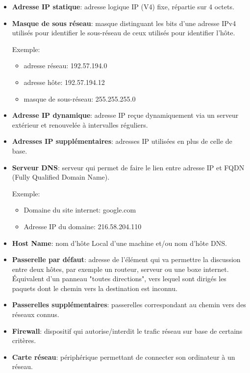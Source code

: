 \documentclass[class=article, crop=false]{standalone}
\begin{document}
\begin{itemize}
    \item \textbf{Adresse IP statique}: adresse logique IP (V4) fixe, répartie sur 4 octets.
    \item \textbf{Masque de sous réseau}: masque distinguant les bits d'une adresse IPv4 utilisés pour identifier le sous-réseau de ceux utilisés pour identifier l'hôte.
\begin{example}
Exemple:
\begin{itemize}
    \item adresse réseau: 192.57.194.0
    \item adresse hôte: 192.57.194.12
    \item masque de sous-réseau: 255.255.255.0
\end{itemize}
\end{example}
\item \textbf{Adresse IP dynamique}: adresse IP reçue dynamiquement via un serveur extérieur et renouvelée à intervalles réguliers.
\item \textbf{Adresses IP supplémentaires}: adresses IP utilisées en plus de celle de base.
\item \textbf{Serveur DNS}: serveur qui permet de faire le lien entre adresse IP et FQDN (Fully Qualified Domain Name).
\begin{example}
Exemple:
\begin{itemize}
    \item Domaine du site internet: google.com
    \item Adresse IP du domaine: 216.58.204.110
\end{itemize}
\end{example}
\item \textbf{Host Name}: nom d'hôte Local d'une machine et/ou nom d’hôte DNS.
\item \textbf{Passerelle par défaut}: adresse de l’élément qui va permettre la discussion entre deux hôtes, par exemple un routeur, serveur ou une boxe internet. Équivalent d'un panneau "toutes directions", vers lequel sont dirigés les paquets dont le chemin vers la destination est inconnu.
\item \textbf{Passerelles supplémentaires}: passerelles correspondant au chemin vers des réseaux connus.
\item \textbf{Firewall}: dispositif qui autorise/interdit le trafic réseau sur base de certains critères.
\item \textbf{Carte réseau}: périphérique permettant de connecter son ordinateur à un réseau. \\

\end{itemize}
\end{document}
